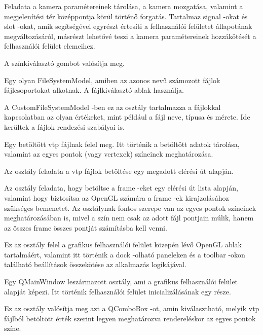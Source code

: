 \begin{description}[font=\normalfont\itshape\bfseries\space]
\item [Camera:]
Feladata a kamera paramétereinek tárolása, 
a kamera mozgatása, valamint 
a megjelenítési tér középpontja körül történő forgatás. 
Tartalmaz signal -okat és slot -okat, 
amik segítségével egyrészt értesíti 
a felhasználói felületet állapotának megváltozásáról, 
másrészt lehetővé teszi a kamera paramétereinek hozzákötését 
a felhasználói felület elemeihez.
\item [ColorButton:]
A színkiválasztó gombot valósítja meg.
\item [CustomFileSystemModel:]
Egy olyan FileSystemModel, 
amiben az azonos nevű számozott fájlok fájlcsoportokat alkotnak. 
A fájlkiválasztó ablak használja.
\item [FileEntry:]
A {\ttfamily CustomFileSystemModel} -ben ez az osztály tartalmazza 
a fájlokkal kapcsolatban az olyan értékeket, 
mint például a fájl neve, típusa és mérete. 
Ide kerültek a fájlok rendezési szabályai is.
\item [Frame:]
Egy betöltött vtp fájlnak felel meg. 
Itt történik a betöltött adatok tárolása, 
valamint az egyes pontok (vagy vertexek) színeinek meghatározása.
\item [FrameReader:]
Az osztály feladata a vtp fájlok betöltése egy megadott elérési út alapján.
\item [FrameSystem:]
Az osztály feladata, 
hogy betöltse a frame -eket egy elérési út lista alapján, 
valamint hogy biztosítsa az OpenGL számára 
a frame -ek kirajzolásához szükséges bemenetet. 
Az osztálynak fontos szerepe van az egyes pontok színeinek meghatározásában is, 
mivel a szín nem csak az adott fájl pontjain múlik, 
hanem az összes frame összes pontját számításba kell venni.
\item [GLWidget:]
Ez az osztály felel a grafikus felhasználói felület 
közepén lévő OpenGL ablak tartalmáért, 
valamint itt történik 
a dock -olható paneleken és a toolbar -okon található 
beállítások összekötése az alkalmazás logikájával.
\item [MainWindow:]
Egy {\ttfamily QMainWindow} leszármazott osztály, 
ami a grafikus felhasználói felület alapját képezi. 
Itt történik felhasználói felület inicializálásának egy része.
\item [MaterialColoringComboBox:]
Ez az osztály valósítja meg azt a {\ttfamily QComboBox} -ot, 
amin kiválasztható, 
melyik vtp fájlból betöltött érték szerint legyen meghatározva rendereléskor 
az egyes pontok színe.

\end{description}
